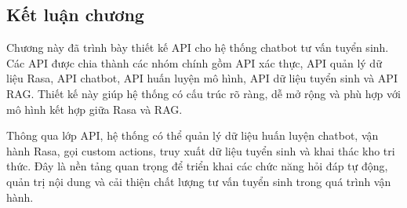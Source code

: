 \subsection{Kết luận chương}

Chương này đã trình bày thiết kế API cho hệ thống chatbot tư vấn tuyển sinh. Các API được chia thành các nhóm chính gồm API xác thực, API quản lý dữ liệu Rasa, API chatbot, API huấn luyện mô hình, API dữ liệu tuyển sinh và API RAG. Thiết kế này giúp hệ thống có cấu trúc rõ ràng, dễ mở rộng và phù hợp với mô hình kết hợp giữa Rasa và RAG.

Thông qua lớp API, hệ thống có thể quản lý dữ liệu huấn luyện chatbot, vận hành Rasa, gọi custom actions, truy xuất dữ liệu tuyển sinh và khai thác kho tri thức. Đây là nền tảng quan trọng để triển khai các chức năng hỏi đáp tự động, quản trị nội dung và cải thiện chất lượng tư vấn tuyển sinh trong quá trình vận hành.
